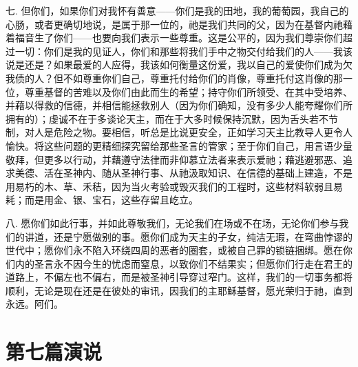 七. 但你们，如果你们对我怀有善意——你们是我的田地，我的葡萄园，我自己的心肠，或者更确切地说，是属于那一位的，祂是我们共同的父，因为在基督内祂藉着福音生了你们——也要向我们表示一些尊重。这是公平的，因为我们尊崇你们超过一切：你们是我的见证人，你们和那些将我们手中之物交付给我们的人——我该说是还是？如果最爱的人应得，我该如何衡量这份爱，我以自己的爱使你们成为欠我债的人？但不如尊重你们自己，尊重托付给你们的肖像，尊重托付这肖像的那一位，尊重基督的苦难以及你们由此而生的希望；持守你们所领受、在其中受培养、并藉以得救的信德，并相信能拯救别人（因为你们确知，没有多少人能夸耀你们所拥有的）；虔诚不在于多谈论天主，而在于大多时候保持沉默，因为舌头若不节制，对人是危险之物。要相信，听总是比说更安全，正如学习天主比教导人更令人愉快。将这些问题的更精细探究留给那些圣言的管家；至于你们自己，用言语少量敬拜，但更多以行动，并藉遵守法律而非仰慕立法者来表示爱祂；藉逃避邪恶、追求美德、活在圣神内、随从圣神行事、从祂汲取知识、在信德的基础上建造，不是用易朽的木、草、禾秸，因为当火考验或毁灭我们的工程时，这些材料软弱且易耗；而是用金、银、宝石，这些存留且屹立。\par

八. 愿你们如此行事，并如此尊敬我们，无论我们在场或不在场，无论你们参与我们的讲道，还是宁愿做别的事。愿你们成为天主的子女，纯洁无瑕，在弯曲悖谬的世代中；愿你们永不陷入环绕四周的恶者的圈套，或被自己罪的锁链捆绑。愿在你们内的圣言永不因今生的忧虑而窒息，以致你们不结果实；但愿你们行走在君王的道路上，不偏左也不偏右，而是被圣神引导穿过窄门。这样，我们的一切事务都将顺利，无论是现在还是在彼处的审讯，因我们的主耶稣基督，愿光荣归于祂，直到永远。阿们。\par



\section{第七篇演说}

\par

